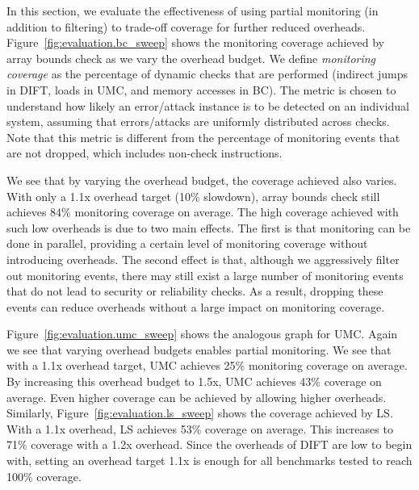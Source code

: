 In this section, we evaluate the effectiveness of
using partial monitoring (in addition to filtering) to trade-off coverage for further reduced overheads.
Figure~\ref{fig:evaluation.bc_sweep} shows the monitoring coverage achieved by
array bounds check as we vary the overhead budget. 
We define \emph{monitoring coverage} as the 
percentage of dynamic checks that are performed 
(indirect jumps in DIFT, loads in UMC, and memory accesses in BC). 
The metric is chosen to understand
how likely an error/attack instance is to be detected on an individual system, 
assuming that errors/attacks are uniformly distributed across checks. 
Note that this metric is different from the
percentage of monitoring events that are not dropped, which includes
non-check instructions.

We see that by varying the overhead budget, the coverage achieved also varies.
With only a 1.1x overhead target (10\% slowdown), array bounds check still
achieves 84\% monitoring coverage on average. The high coverage
achieved with such low overheads is due to two main effects.  The first is that
monitoring can be done in parallel, providing a certain level of monitoring coverage without
introducing overheads. The second effect is that, although we aggressively
filter out monitoring events, there may still exist a large number of
monitoring events that do not lead to security or reliability checks. As a
result, dropping these events can reduce overheads without a large impact on
monitoring coverage.

Figure~\ref{fig:evaluation.umc_sweep} shows the analogous graph for UMC. Again
we see that varying overhead budgets enables partial monitoring. We see that
with a 1.1x overhead target, UMC achieves 25\% monitoring coverage on average.
By increasing this overhead budget to 1.5x, UMC achieves 43\% coverage on
average. Even higher coverage can be achieved by allowing higher overheads.
Similarly, Figure~\ref{fig:evaluation.ls_sweep} shows the coverage achieved by LS.
With a 1.1x overhead, LS achieves 53\% coverage on average. This increases to
71\% coverage with a 1.2x overhead. 
Since the overheads of DIFT are low to begin with, setting an overhead target
1.1x is enough for all benchmarks tested to reach 100\% coverage.

